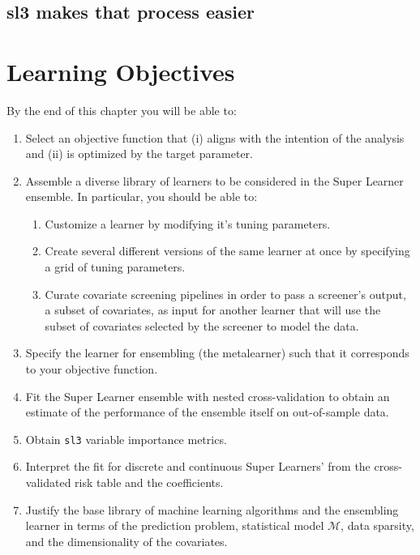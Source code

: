 \documentclass[
  12pt, krantz2,
]{krantz}
\newcommand{\passthrough}[1]{#1}
\providecommand{\tightlist}{%
  \setlength{\itemsep}{0pt}\setlength{\parskip}{0pt}}
\theoremstyle{definition}
\theoremstyle{definition}
\theoremstyle{definition}
\newcommand{\M}{\mathcal{M}}
\newcommand{\1}{\mathbbm{1}}
\begin{document}
\hypertarget{sl3-makes-that-process-easier}{%
\subsection{sl3 makes that process easier}\label{sl3-makes-that-process-easier}}

\hypertarget{learning-objectives-2}{%
\section*{Learning Objectives}\label{learning-objectives-2}}


By the end of this chapter you will be able to:

\begin{enumerate}
\def\labelenumi{\arabic{enumi}.}
\item
  Select an objective function that (i) aligns with the intention of the
  analysis and (ii) is optimized by the target parameter.
\item
  Assemble a diverse library of learners to be considered in the Super Learner
  ensemble. In particular, you should be able to:

  \begin{enumerate}
  \def\labelenumii{\alph{enumii}.}
  \tightlist
  \item
    Customize a learner by modifying it's tuning parameters.
  \item
    Create several different versions of the same learner at once by
    specifying a grid of tuning parameters.
  \item
    Curate covariate screening pipelines in order to pass a screener's
    output, a subset of covariates, as input for another learner that will
    use the subset of covariates selected by the screener to model the data.
  \end{enumerate}
\item
  Specify the learner for ensembling (the metalearner) such that it corresponds
  to your objective function.
\item
  Fit the Super Learner ensemble with nested cross-validation to obtain an
  estimate of the performance of the ensemble itself on out-of-sample data.
\item
  Obtain \passthrough{\lstinline!sl3!} variable importance metrics.
\item
  Interpret the fit for discrete and continuous Super Learners' from the
  cross-validated risk table and the coefficients.
\item
  Justify the base library of machine learning algorithms and the ensembling
  learner in terms of the prediction problem, statistical model \(\M\), data
  sparsity, and the dimensionality of the covariates.
\end{enumerate}
\end{document}
